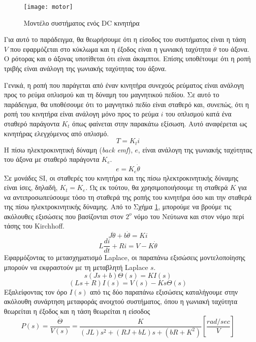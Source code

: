 \begin{figure}[h]
  \centering
  \texttt{[image: motor]}
  \caption{Μοντέλο συστήματος ενός DC κινητήρα}
  \label{fig:motor}
\end{figure}

Για αυτό το παράδειγμα, θα θεωρήσουμε ότι η είσοδος του συστήματος είναι η τάση $V$ που εφαρμόζεται στο κύκλωμα και η έξοδος είναι η γωνιακή ταχύτητα $\dot{\theta}$ του άξονα. Ο ρότορας και ο άξονας υποτίθεται ότι είναι άκαμπτοι. Επίσης υποθέτουμε ότι η ροπή τριβής είναι ανάλογη της γωνιακής ταχύτητας του άξονα.

Γενικά, η ροπή που παράγεται από έναν κινητήρα συνεχούς ρεύματος είναι ανάλογη προς το ρεύμα οπλισμού και τη δύναμη του μαγνητικού πεδίου. Σε αυτό το παράδειγμα, θα υποθέσουμε ότι το μαγνητικό πεδίο είναι σταθερό και, συνεπώς, ότι η ροπή του κινητήρα είναι ανάλογη μόνο προς το ρεύμα $i$ του οπλισμού κατά ένα σταθερό παράγοντα $K_t$ όπως φαίνεται στην παρακάτω εξίσωση. Αυτό αναφέρεται ως κινητήρας ελεγχόμενος από οπλισμό.
\begin{equation}
T = K_ti
\end{equation}
Η πίσω ηλεκτροκινητική δύναμη (\emph{back emf}), $e$, είναι ανάλογη της γωνιακής ταχύτητας του άξονα με σταθερό παράγοντα $K_e$.
\begin{equation}
e = K_e\dot{\theta}
\end{equation}
Σε μονάδες SI, οι σταθερές του κινητήρα και της πίσω ηλεκτροκινητικής δύναμης είναι ίσες, δηλαδή, $K_t = K_e$. Ως εκ τούτου, θα χρησιμοποιήσουμε τη σταθερά $K$ για να αντιπροσωπεύσουμε τόσο τη σταθερά της ροπής του κινητήρα όσο και την σταθερά της πίσω ηλεκτροκινητικής δύναμης. Από το Σχήμα \ref{fig:motor}, μπορούμε να βρούμε τις ακόλουθες εξισώσεις που βασίζονται στον $2^o$ νόμο του Νεύτωνα και στον νόμο περί τάσης του Kirchhoff.
\begin{equation}
J\ddot{\theta} + b\dot{\theta} = Ki
\end{equation}
\begin{equation}
L\frac{di}{dt} + Ri = V - K\dot{\theta}
\end{equation}
Εφαρμόζοντας το μετασχηματισμό Laplace, οι παραπάνω εξισώσεις μοντελοποίησης μπορούν να εκφραστούν με τη μεταβλητή Laplace $s$.
\begin{equation}
s(Js+b)\Theta(s) = KI(s)
\end{equation}
\begin{equation}
(Ls+R)I(s) = V(s) - Ks\Theta(s)
\end{equation}
Εξαλείφοντας τον όρο $I(s)$ από τις δύο παραπάνω εξισώσεις καταλήγουμε στην ακόλουθη συνάρτηση μεταφοράς ανοιχτού συστήματος, όπου η γωνιακή ταχύτητα θεωρείται η έξοδος και η τάση θεωρείται η είσοδος
\begin{equation}
P(s) = \frac{\dot{\Theta}}{V(s)} = \frac{K}{(JL)s^2+(RJ+bL)s+(bR+K^2)} \left[\frac{rad/sec}{V}\right]
\label{eq:motor_laplace}
\end{equation}

